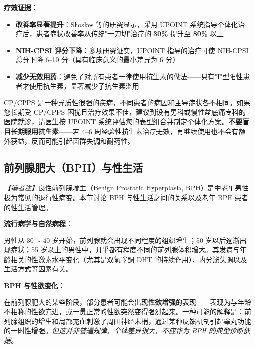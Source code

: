 \begin{enumerate}
\vspace{0.5em}
\noindent\textbf{疗效证据}：

\begin{itemize}[leftmargin=2cm]
	\item \textbf{改善率显著提升}：Shoskes 等的研究显示，采用 UPOINT 系统指导个体化治疗后，患者症状改善率从传统"一刀切"治疗的 \textbf{30\%} 提升至 \textbf{80\%} 以上
	\item \textbf{NIH-CPSI 评分下降}：多项研究证实，UPOINT 指导的治疗可使 NIH-CPSI 总分下降 6--10 分（具有临床意义的最小差异为 6 分）
	\item \textbf{减少无效用药}：避免了对所有患者一律使用抗生素的做法——只有"I"型阳性患者才使用抗生素，显著减少了抗生素滥用
\end{itemize}

\begin{tcolorbox}[colback=pink!5!white,colframe=red!50!black,title=贴心小叮咛]
CP/CPPS 是一种异质性很强的疾病，不同患者的病因和主导症状各不相同。如果您长期受 CP/CPPS 困扰且治疗效果不佳，建议到设有男科或慢性盆底痛专科的医院就诊，请医生按 UPOINT 系统评估您的表型组合并制定个体化方案。\textbf{不要盲目长期服用抗生素}——若 4--6 周经验性抗生素治疗无效，再继续使用也不会有额外获益，反而可能引起菌群失调和耐药性。
\end{tcolorbox}

\subsection{前列腺肥大（BPH）与性生活}

\noindent\textit{【编者注】}良性前列腺增生（Benign Prostatic Hyperplasia, BPH）是中老年男性极为常见的退行性病变。本节讨论 BPH 与性生活之间的关系以及老年 BPH 患者的性生活管理。

\vspace{0.5em}
\noindent\textbf{流行病学与自然病程}：

男性从 $30\sim40$ 岁开始，前列腺就会出现不同程度的组织增生；50 岁以后逐渐出现症状；55 岁以上的男性中，几乎都有程度不同的前列腺体积增大。其发病与年龄相关的性激素水平变化（尤其是双氢睾酮 DHT 的持续作用）、内分泌失调以及生活方式等因素有关。

\vspace{0.5em}
\noindent\textbf{BPH 与性欲变化}：

在前列腺肥大的某些阶段，部分患者可能会出现\textbf{性欲增强}的表现——表现为与年龄不相称的性欲亢进，或一贯正常的性欲突然变得强烈起来。一种可能的解释是：前列腺组织的增生和局部充血刺激了周围神经末梢，通过某种反馈机制引起睾丸功能的一时性增强。\textit{但这并非普遍规律，个体差异很大，不应作为 BPH 的典型诊断依据。}


\end{enumerate}
